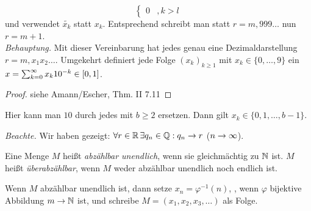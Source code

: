 \documentclass[12pt]{scrreprt}
\begin{document}
\begin{bsp}[Dezimaldarstellung]
\[\begin{cases}
    0     &, k>l
  \end{cases}
  \] und verwendet $\widetilde{x_k}$ statt $x_k$. Entsprechend schreibt
  man statt $r=m{,}999\dotsc$ nun $r=m+1$.\\
  \emph{Behauptung.} Mit dieser Vereinbarung hat jedes  genau
  eine Dezimaldarstellung $r=m{,}x_1x_2\dotsc$. Umgekehrt definiert
  jede Folge $(x_k)_{k\ge1}$ mit $x_k\in\{0,\dotsc,9\}$ ein
  $x=\sum_{k=0}^\infty x_k10^{-k}\in[0,1]$.
  \begin{proof} siehe Amann/Escher, Thm. II 7.11 \end{proof}
  \begin{bem*}
    Hier kann man $10$ durch jedes  mit $b\ge2$ ersetzen. Dann
    gilt $x_k\in\{0,1,\dotsc,b-1\}$.
  \end{bem*}
  \noindent \emph{Beachte.} Wir haben gezeigt: $\forall r\in\mathbb{R} \, \exists
  q_n\in\mathbb{Q}: q_n\to r$ ($n\rightarrow\infty$).
\end{bsp}

\begin{dfn}
  \label{dfn:reihen.abzaehlbar}
  Eine Menge $M$ heißt \emph{abzählbar unendlich}, wenn sie
  gleichmächtig zu $\mathbb{N}$ ist. $M$ heißt \emph{überabzählbar}, wenn
  $M$ weder abzählbar unendlich noch endlich ist.
\end{dfn}
\begin{bem*}
  Wenn $M$ abzählbar unendlich ist, dann setze $x_n=\varphi^{-1}(n)$,
  , wenn $\varphi$ bijektive Abbildung $m\rightarrow\mathbb{N}$ ist, und
  schreibe $M=(x_1,x_2,x_3,\dotsc)$ als Folge.
\end{bem*}
\end{document}
